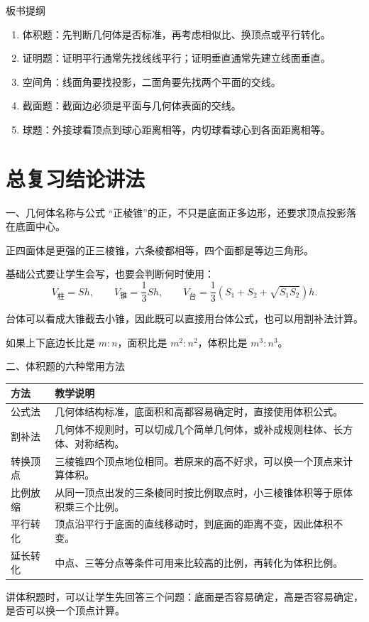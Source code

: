 \documentclass[11pt,a4paper]{ctexart}
\begin{document}
\begin{teachbox}{板书提纲}
\begin{enumerate}[label=\arabic*. , leftmargin=2em, itemsep=0.35em]
  \item 体积题：先判断几何体是否标准，再考虑相似比、换顶点或平行转化。
  \item 证明题：证明平行通常先找线线平行；证明垂直通常先建立线面垂直。
  \item 空间角：线面角要找投影，二面角要先找两个平面的交线。
  \item 截面题：截面边必须是平面与几何体表面的交线。
  \item 球题：外接球看顶点到球心距离相等，内切球看球心到各面距离相等。
\end{enumerate}
\end{teachbox}

\section{总复习结论讲法}

\begin{teachbox}{一、几何体名称与公式}
“正棱锥”的正，不只是底面正多边形，还要求顶点投影落在底面中心。

正四面体是更强的正三棱锥，六条棱都相等，四个面都是等边三角形。

基础公式要让学生会写，也要会判断何时使用：
\[
  V_{\text{柱}}=Sh,
  \qquad
  V_{\text{锥}}=\frac13Sh,
  \qquad
  V_{\text{台}}=\frac13(S_1+S_2+\sqrt{S_1S_2})h.
\]

台体可以看成大锥截去小锥，因此既可以直接用台体公式，也可以用割补法计算。

如果上下底边长比是 \(m:n\)，面积比是 \(m^2:n^2\)，体积比是 \(m^3:n^3\)。
\end{teachbox}

\begin{teachbox}{二、体积题的六种常用方法}
\renewcommand{\arraystretch}{1.35}
\begin{tabularx}{\textwidth}{p{2.7cm}X}
\toprule
方法 & 教学说明 \\
\midrule
公式法 & 几何体结构标准，底面积和高都容易确定时，直接使用体积公式。\\ \hline
割补法 & 几何体不规则时，可以切成几个简单几何体，或补成规则柱体、长方体、对称结构。\\ \hline
转换顶点 & 三棱锥四个顶点地位相同。若原来的高不好求，可以换一个顶点来计算体积。\\ \hline
比例放缩 & 从同一顶点出发的三条棱同时按比例取点时，小三棱锥体积等于原体积乘三个比例。\\ \hline
平行转化 & 顶点沿平行于底面的直线移动时，到底面的距离不变，因此体积不变。\\ \hline
延长转化 & 中点、三等分点等条件可用来比较高的比例，再转化为体积比例。\\
\bottomrule
\end{tabularx}

讲体积题时，可以让学生先回答三个问题：底面是否容易确定，高是否容易确定，是否可以换一个顶点计算。
\end{teachbox}
\end{document}
